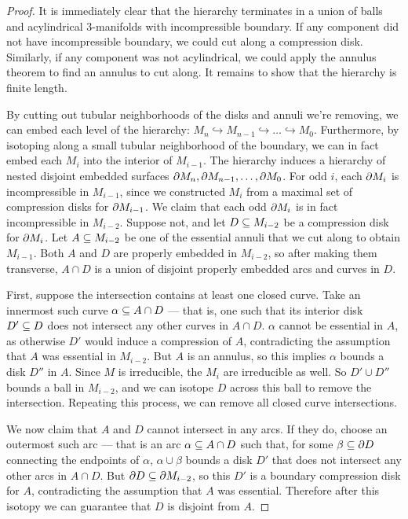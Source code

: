 \begin{proof}

It is immediately clear that the hierarchy terminates in a union of balls and
acylindrical $3$-manifolds with incompressible boundary. If any component did
not have incompressible boundary, we could cut along a compression disk.
Similarly, if any component was not acylindrical, we could apply the annulus
theorem to find an annulus to cut along. It remains to show that the hierarchy
is finite length.

By cutting out tubular neighborhoods of the disks and annuli we're removing, we
can embed each level of the hierarchy: $M_n \hookrightarrow M_{n-1}
\hookrightarrow \dots \hookrightarrow M_0$. Furthermore, by isotoping along
a small tubular neighborhood of the boundary, we can in fact embed each $M_i$
into the interior of $M_{i-1}$. The hierarchy induces a hierarchy of nested
disjoint embedded surfaces $\partial M_n, \partial M_{n-1}, \dots, \partial M_0$. For odd $i$,
each $\partial M_i$ is incompressible in $M_{i-1}$, since we constructed $M_i$ from
a maximal set of compression disks for $\partial M_{i-1}$.  We claim that each odd
$\partial M_i$ is in fact incompressible in $M_{i-2}$.  Suppose not, and let $D \subseteq
M_{i-2}$ be a compression disk for $\partial M_i$. Let $A \subseteq M_{i-2}$ be one of
the essential annuli that we cut along to obtain $M_{i-1}$. Both $A$ and $D$
are properly embedded in $M_{i-2}$, so after making them transverse, $A \cap D$
is a union of disjoint properly embedded arcs and curves in $D$.

First, suppose the intersection contains at least one closed curve. Take an
innermost such curve $\alpha \subseteq A \cap D$ --- that is, one such that its
interior disk $D' \subseteq D$ does not intersect any other curves in $A \cap D$.
$\alpha$ cannot be essential in $A$, as otherwise $D'$ would induce
a compression of $A$, contradicting the assumption that $A$ was essential in
$M_{i-2}$.  But $A$ is an annulus, so this implies $\alpha$ bounds a disk $D''$
in $A$.  Since $M$ is irreducible, the $M_i$ are irreducible as well.  So $D'
\cup D''$ bounds a ball in $M_{i-2}$, and we can isotope $D$ across this ball
to remove the intersection.  Repeating this process, we can remove all closed
curve intersections.

We now claim that $A$ and $D$ cannot intersect in any arcs. If they do, choose
an outermost such arc --- that is an arc $\alpha \subseteq A \cap D$ such that, for
some $\beta \subseteq \partial D$ connecting the endpoints of $\alpha$, $\alpha \cup
\beta$ bounds a disk $D'$ that does not intersect any other arcs in $A \cap D$.
But $\partial D \subseteq \partial M_{i-2}$, so this $D'$ is a boundary compression disk for
$A$, contradicting the assumption that $A$ was essential. Therefore after this
isotopy we can guarantee that $D$ is disjoint from $A$.


\end{proof}
